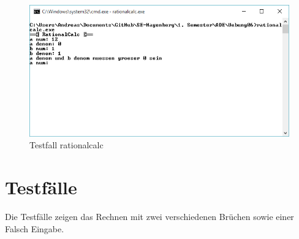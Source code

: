 \begin{figure}[H]
	\centering
	\includegraphics[scale=0.85]{./pictures/rationalcalc2.png}
	\caption{Testfall rationalcalc}
	\label{fig: rationalcalc2}
\end{figure}

\section*{Testfälle}
Die Testfälle zeigen das Rechnen mit zwei verschiedenen Brüchen sowie einer Falsch Eingabe.
\newpage